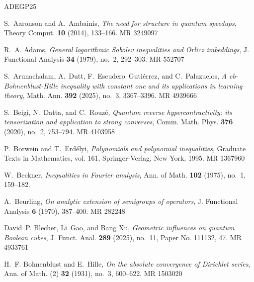 \documentclass{amsbook}
\theoremstyle{definition}
\theoremstyle{remark}
\numberwithin{section}{chapter}
\numberwithin{equation}{chapter}
\newcommand{\1}{\mathbf{1}}
\begin{document}
%
%


\newcommand{\etalchar}[1]{$^{#1}$}
\providecommand{\bysame}{\leavevmode\hbox to3em{\hrulefill}\thinspace}
\providecommand{\MR}{\relax\ifhmode\unskip\space\fi MR }
\providecommand{\MRhref}[2]{%
	\href{http://www.ams.org/mathscinet-getitem?mr=#1}{#2}
}
\providecommand{\href}[2]{#2}
\begin{thebibliography}{ADEGP25}
	
	S.~Aaronson and A.~Ambainis, \emph{The need for structure in quantum speedups},
	Theory Comput. \textbf{10} (2014), 133--166. \MR{3249097}
	
	R.~A. Adams, \emph{General logarithmic {S}obolev inequalities and {O}rlicz
		imbeddings}, J. Functional Analysis \textbf{34} (1979), no.~2, 292--303.
	\MR{552707}
	
	S.~Arunachalam, A.~Dutt, F.~Escudero~Guti\'errez, and C.~Palazuelos, \emph{A
		cb-{B}ohnenblust-{H}ille inequality with constant one and its applications in
		learning theory}, Math. Ann. \textbf{392} (2025), no.~3, 3367--3396.
	\MR{4939666}
	
	S.~Beigi, N.~Datta, and C.~Rouz\'{e}, \emph{Quantum reverse hypercontractivity:
		its tensorization and application to strong converses}, Comm. Math. Phys.
	\textbf{376} (2020), no.~2, 753--794. \MR{4103958}
	
	P.~Borwein and T.~Erd\'{e}lyi, \emph{Polynomials and polynomial inequalities},
	Graduate Texts in Mathematics, vol. 161, Springer-Verlag, New York, 1995.
	\MR{1367960}
	
	W.~Beckner, \emph{Inequalities in {F}ourier analysis}, Ann. of Math.
	\textbf{102} (1975), no.~1, 159--182.
	
	A.~Beurling, \emph{On analytic extension of semigroups of operators}, J.
	Functional Analysis \textbf{6} (1970), 387--400. \MR{282248}
	
	David~P. Blecher, Li~Gao, and Bang Xu, \emph{Geometric influences on quantum
		{B}oolean cubes}, J. Funct. Anal. \textbf{289} (2025), no.~11, Paper No.
	111132, 47. \MR{4933761}
	
	H.~F. Bohnenblust and E.~Hille, \emph{On the absolute convergence of
		{D}irichlet series}, Ann. of Math. (2) \textbf{32} (1931), no.~3, 600--622.
	\MR{1503020}
	

\end{thebibliography}
\end{document}

